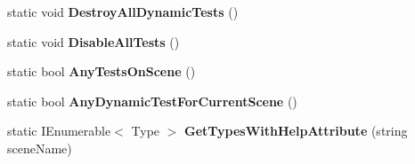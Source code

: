 \begin{DoxyCompactItemize}
\item 
\mbox{\label{class_unity_test_1_1_test_component_aa6fc2e636057ebcc33afc1bbf8f6a98d}} 
static void {\bfseries Destroy\+All\+Dynamic\+Tests} ()
\item 
\mbox{\label{class_unity_test_1_1_test_component_a290117041c50aab91fe4e66f96339c3e}} 
static void {\bfseries Disable\+All\+Tests} ()
\item 
\mbox{\label{class_unity_test_1_1_test_component_ae5745195b421dadba1750f1bc9ab52b7}} 
static bool {\bfseries Any\+Tests\+On\+Scene} ()
\item 
\mbox{\label{class_unity_test_1_1_test_component_a4db019cfe073f2ffde79b22504949745}} 
static bool {\bfseries Any\+Dynamic\+Test\+For\+Current\+Scene} ()
\item 
\mbox{\label{class_unity_test_1_1_test_component_a1fc1de92a248e3486ce12c84620f8232}} 
static I\+Enumerable$<$ Type $>$ {\bfseries Get\+Types\+With\+Help\+Attribute} (string scene\+Name)
\end{DoxyCompactItemize}
